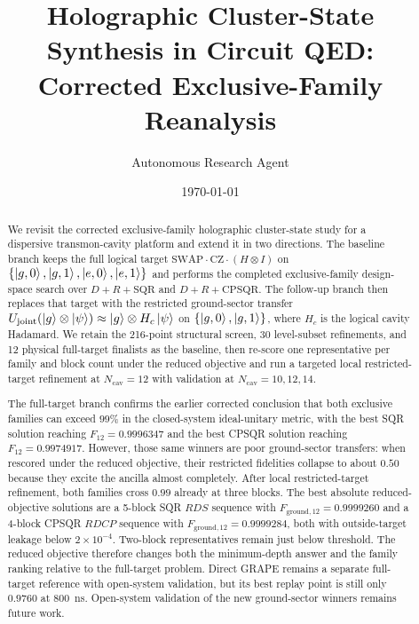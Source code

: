 ﻿\documentclass[aps,pra,twocolumn,reprint,amsmath,amssymb,floatfix]{revtex4-2}
\begin{document}
\title{Holographic Cluster-State Synthesis in Circuit QED:\\
Corrected Exclusive-Family Reanalysis}

\author{Autonomous Research Agent}
\date{\today}

\begin{abstract}
We revisit the corrected exclusive-family holographic cluster-state study for a
dispersive transmon-cavity platform and extend it in two directions. The
baseline branch keeps the full logical target
$\mathrm{SWAP}\cdot\mathrm{CZ}\cdot(H\otimes I)$ on
$\{\ket{g,0},\ket{g,1},\ket{e,0},\ket{e,1}\}$ and performs the completed
exclusive-family design-space search over $D+R+\mathrm{SQR}$ and
$D+R+\mathrm{CPSQR}$. The follow-up branch then replaces that target with the
restricted ground-sector transfer
$U_{\mathrm{joint}}(\ket{g}\otimes\ket{\psi})\approx
\ket{g}\otimes H_c\ket{\psi}$ on $\{\ket{g,0},\ket{g,1}\}$, where $H_c$ is
the logical cavity Hadamard. We retain the 216-point structural screen, 30
level-subset refinements, and 12 physical full-target finalists as the
baseline, then re-score one representative per family and block count under the
reduced objective and run a targeted local restricted-target refinement at
$N_{\mathrm{cav}}=12$ with validation at $N_{\mathrm{cav}}=10,12,14$.

The full-target branch confirms the earlier corrected conclusion that both
exclusive families can exceed $99\%$ in the closed-system ideal-unitary metric,
with the best SQR solution reaching $F_{12}=0.9996347$ and the best CPSQR
solution reaching $F_{12}=0.9974917$. However, those same winners are poor
ground-sector transfers: when rescored under the reduced objective, their
restricted fidelities collapse to about $0.50$ because they excite the ancilla
almost completely. After local restricted-target refinement, both families
cross $0.99$ already at three blocks. The best absolute reduced-objective
solutions are a 5-block SQR $RDS$ sequence with
$F_{\mathrm{ground},12}=0.9999260$ and a 4-block CPSQR $RDCP$ sequence with
$F_{\mathrm{ground},12}=0.9999284$, both with outside-target leakage below
$2\times10^{-4}$. Two-block representatives remain just below threshold. The
reduced objective therefore changes both the minimum-depth answer and the family
ranking relative to the full-target problem. Direct GRAPE remains a separate
full-target reference with open-system validation, but its best replay point is
still only $0.9760$ at \SI{800}{ns}. Open-system validation of the new
ground-sector winners remains future work.
\end{abstract}
\end{document}
